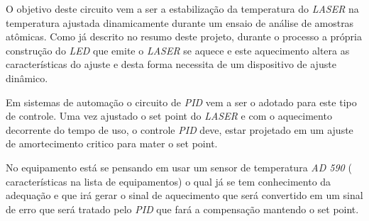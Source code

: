 
\par O objetivo deste circuito vem a ser a estabilização da temperatura do \emph{LASER}  na temperatura ajustada dinamicamente durante um ensaio de análise de amostras atômicas. 
Como já descrito no resumo deste projeto, durante o processo a própria construção do \emph{LED} que emite o \emph{LASER} se aquece e este aquecimento altera as características do ajuste e desta forma necessita de um dispositivo de ajuste dinâmico. 

Em sistemas de automação o circuito de \emph{PID} vem a ser o adotado para este tipo de controle. 
Uma vez ajustado o set point do \emph{LASER} e com o aquecimento decorrente do tempo de uso, o controle \emph{PID} deve, estar projetado em um ajuste de amortecimento critico para mater o set point. 

No equipamento está se pensando em usar um sensor de temperatura \emph{AD 590} ( características na lista de equipamentos) o qual já se tem conhecimento da adequação e que irá gerar o sinal de aquecimento que será convertido em um sinal de erro que será tratado pelo \emph{PID} que fará a compensação mantendo o set point. 
